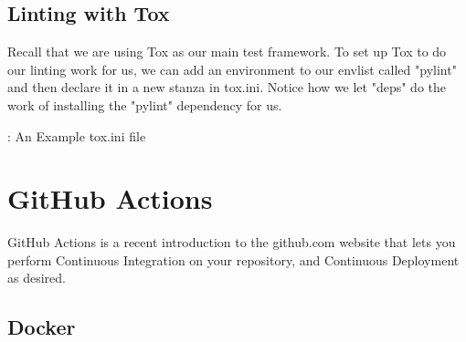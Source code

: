 
\subsection{Linting with Tox}

Recall that we are using Tox as our main test framework. To set up Tox
to do our linting work for us, we can add an environment to our envlist
called "pylint" and then declare it in a new stanza in tox.ini. Notice
how we let "deps" do the work of installing the "pylint" dependency for
us.

\begin{mybox}{\thetcbcounter: An Example tox.ini file}
	
\end{mybox}

\section{GitHub Actions}

\justify
GitHub Actions is a recent introduction to the github.com website that
lets you perform Continuous Integration on your repository, and Continuous Deployment as desired.

\subsection{Docker}

